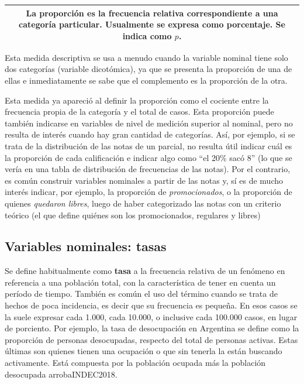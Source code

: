\documentclass[]{book}
\begin{document}
\begin{longtable}[]{@{}c@{}}
\toprule
\endhead
\begin{minipage}[t]{0.97\columnwidth}\centering
La \textbf{proporción} es la frecuencia relativa correspondiente a una categoría particular. Usualmente se expresa como porcentaje. Se indica como \(p\).\strut
\end{minipage}\tabularnewline
\bottomrule
\end{longtable}

Esta medida descriptiva se usa a menudo cuando la variable nominal tiene solo dos categorías (variable dicotómica), ya que se presenta la proporción de una de ellas e inmediatamente se sabe que el complemento es la proporción de la otra.

Esta medida ya apareció al definir la proporción como el cociente entre la frecuencia propia de la categoría y el total de casos. Esta
proporción puede también indicarse en variables de nivel de medición
superior al nominal, pero no resulta de interés cuando hay gran cantidad de categorías. Así, por ejemplo, si se trata de la distribución de las notas de un parcial, no resulta útil indicar cuál es la proporción de cada calificación e indicar algo como ``el 20\% sacó 8'' (lo que se vería en una tabla de distribución de frecuencias de las notas). Por el contrario, es común construir variables nominales a partir de las notas y, sí es de mucho interés indicar, por ejemplo, la proporción de \emph{promocionados}, o la proporción de quienes \emph{quedaron libres}, luego de haber categorizado las notas con un criterio teórico (el que define quiénes son los promocionados, regulares y libres)

\hypertarget{variables-nominales-tasas}{%
\subsection{Variables nominales: tasas}\label{variables-nominales-tasas}}

Se define habitualmente como \textbf{tasa} a la frecuencia relativa de un
fenómeno en referencia a una población total, con la característica de tener en cuenta un período de tiempo. También es común el uso del
término cuando se trata de hechos de poca incidencia, es decir que su
frecuencia es pequeña. En esos casos se la suele expresar cada 1.000,
cada 10.000, o inclusive cada 100.000 casos, en lugar de porciento. Por ejemplo, la tasa de desocupación en Argentina se define como la proporción de personas desocupadas, respecto del total de personas activas. Estas últimas son quienes tienen una ocupación o que sin tenerla la están buscando activamente. Está compuesta por la población ocupada más la población desocupada arrobaINDEC2018.
\end{document}
